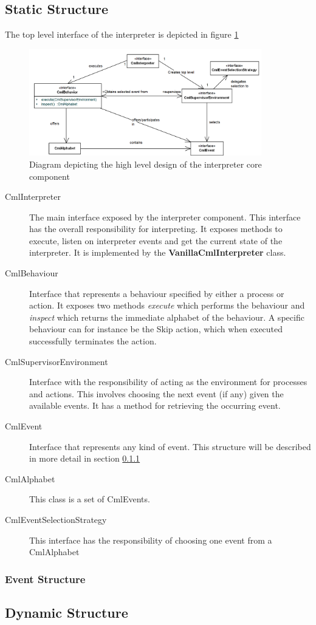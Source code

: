 \documentclass[a4paper, 12pt]{include/compassreport}   %
\begin{document}
\subsection{Static Structure}
\label{sec:dynamic_structure}
The top level interface of the interpreter is depicted in figure \ref{fig:interpreter_topLevelStructure}
\begin{figure}[ht!]
  \begin{center}
    \includegraphics[width=0.9\textwidth]{figures/toplevelStructure}
    \caption{Diagram depicting the high level design of the interpreter core component}
    \label{fig:interpreter_topLevelStructure}
  \end{center}
\end{figure}

\begin{description}
\item[CmlInterpreter] The main interface exposed by
  the interpreter component. This interface has the overall
  responsibility for interpreting. It exposes methods to execute, listen
  on interpreter events and get the current state of the interpreter. It
  is implemented by the \textbf{VanillaCmlInterpreter} class.

\item[CmlBehaviour] Interface that represents a
  behaviour specified by either a process or action. It exposes two
  methods \emph{execute} which performs the behaviour and
  \emph{inspect} which returns the immediate alphabet of the
  behaviour. A specific behaviour can for instance be the Skip action,
  which when executed successfully terminates the action.
\item [CmlSupervisorEnvironment] Interface with the
  responsibility of acting as the environment for processes and
  actions. This involves choosing the next event (if any) given the
  available events. It has a method for retrieving the occurring
  event.
\item[CmlEvent] Interface that represents any kind of event. This
structure will be described in more detail in section
\ref{sec:event_structure}
\item[CmlAlphabet] This class is a set of CmlEvents.
\item[CmlEventSelectionStrategy] This interface has the responsibility
  of choosing one event from a CmlAlphabet
\end{description}

\subsubsection{Event Structure}
\label{sec:event_structure}

\subsection{Dynamic Structure}
\label{sec:dynamic_structure}


\newpage

 
\label{ch:bib} %
\end{document}
